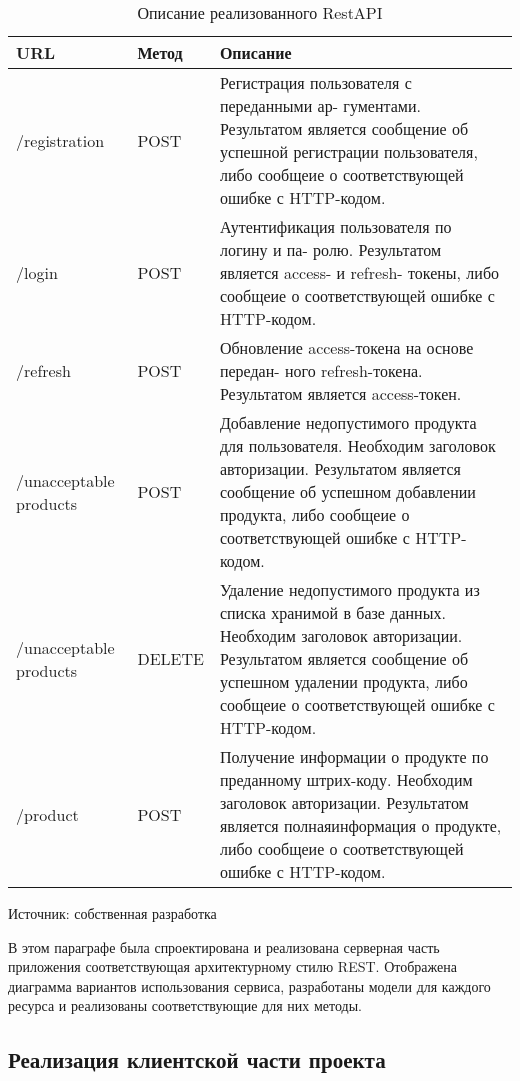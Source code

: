 \begin{singlespacing}
	\begin{table}[H]
		\caption{Описание реализованного RestAPI}\label{APIdescription}
		\begin{tabular}{|  p{80pt} |  p{80pt} |  p{290pt} |}
			\hline 
			URL & Метод & Описание \\
			\hline
			/registration & POST & Регистрация пользователя с переданными ар-
			гументами. Результатом является сообщение об успешной регистрации пользователя, либо сообщеие о соответствующей ошибке с HTTP-кодом. \\
			\hline
			/login & POST & Аутентификация пользователя по логину и па-
			ролю. Результатом является access- и refresh- токены, либо сообщеие о соответствующей ошибке с HTTP-кодом. \\
			\hline
			/refresh & POST & Обновление access-токена на основе передан-
			ного refresh-токена. Результатом является access-токен. \\
			\hline
			/unacceptable products & POST & Добавление недопустимого продукта для пользователя. Необходим заголовок авторизации. Результатом является сообщение об успешном добавлении продукта, либо сообщеие о соответствующей ошибке с HTTP-кодом. \\
			\hline
			/unacceptable products & DELETE & Удаление недопустимого продукта из списка хранимой в базе данных. Необходим заголовок авторизации. Результатом является сообщение об успешном удалении продукта, либо сообщеие о соответствующей ошибке с HTTP-кодом. \\
			\hline
			/product & POST & Получение информации о продукте по преданному штрих-коду. Необходим заголовок авторизации. Результатом является полнаяинформация о продукте, либо сообщеие о соответствующей ошибке с HTTP-кодом. \\
			\hline
		\end{tabular}
		Источник: собственная разработка
	\end{table}
\end{singlespacing}

В этом параграфе была спроектирована и реализована серверная часть приложения соответствующая архитектурному стилю REST. Отображена диаграмма вариантов использования сервиса, разработаны модели для каждого ресурса и реализованы соответствующие для них методы.
\newline
\newline

\subsection{Реализация клиентской части проекта}

